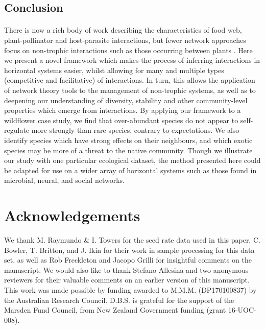 \documentclass[a4,12pt]{article}
\begin{document}
\subsection{Conclusion}

    \paragraph{} 
    There is now a rich body of work describing the characteristics of food web, plant-pollinator and host-parasite interactions, but fewer network approaches focus on non-trophic interactions such as those occurring between plants \parencite{Ellison2019}. Here we present a novel framework which makes the process of inferring  interactions in horizontal systems easier, whilst allowing for many and multiple types (competitive and facilitative) of interactions. In turn, this allows the application of  network theory tools to the management of non-trophic systems, as well as to deepening our understanding of diversity, stability and other community-level properties which emerge from interactions. By applying our framework to a wildflower case study, we find that over-abundant species do not appear to self-regulate more strongly than rare species, contrary to expectations. We also identify species which have strong effects on their neighbours, and which exotic species may be more of a threat to the native community. Though we illustrate our study with one particular ecological dataset, the method presented here could be adapted for use on a wider array of  horizontal systems such as those found in microbial, neural, and social networks. 
   

% 
% 

\section*{Acknowledgements}

We thank M. Raymundo \& I. Towers for the seed rate data used in this paper, C. Bowler, T. Britton, and J. Ikin for their work in sample processing for this data set, as well as Rob Freckleton and Jacopo Grilli for insightful comments on the manuscript. We would also like to thank Stefano Allesina and two anonymous reviewers for their valuable comments on an earlier version of this manuscript. This work was made possible by funding awarded to M.M.M. (DP170100837) by the Australian Research Council. D.B.S. is grateful for the support of the Marsden Fund Council, from New Zealand Government funding (grant 16-UOC-008).
\end{document}
